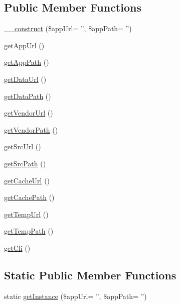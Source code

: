 \subsection*{Public Member Functions}
\begin{DoxyCompactItemize}
\item 
\hyperlink{classTk_1_1Config_ae330d7a7e50597ab4b06e9713b2e629c}{\+\_\+\+\_\+construct} (\$app\+Url= '', \$app\+Path= '')
\item 
\hyperlink{classTk_1_1Config_aaf64cfba50af0da87adcee508253d652}{get\+App\+Url} ()
\item 
\hyperlink{classTk_1_1Config_a663d12fd13dd70777756cff67001b43d}{get\+App\+Path} ()
\item 
\hyperlink{classTk_1_1Config_ac7fab993eb970174b662639954132b2c}{get\+Data\+Url} ()
\item 
\hyperlink{classTk_1_1Config_a194ce70e71e59431958662ce932e57da}{get\+Data\+Path} ()
\item 
\hyperlink{classTk_1_1Config_aab2a6666aee90ed5bd9805f44894ef69}{get\+Vendor\+Url} ()
\item 
\hyperlink{classTk_1_1Config_ae8ed66cab17c82847c779f1356a26555}{get\+Vendor\+Path} ()
\item 
\hyperlink{classTk_1_1Config_a6dfe526acbc3299db77e9251deb731d5}{get\+Src\+Url} ()
\item 
\hyperlink{classTk_1_1Config_ad214878dbfdeeaca36c876c17c3b7cfe}{get\+Src\+Path} ()
\item 
\hyperlink{classTk_1_1Config_adff63f0d8c8b5ac24395edae3a6ab364}{get\+Cache\+Url} ()
\item 
\hyperlink{classTk_1_1Config_a5cd69177657c4eec63a981bceb3c8208}{get\+Cache\+Path} ()
\item 
\hyperlink{classTk_1_1Config_a89a075190ce0e61460a0e0e087eeaa94}{get\+Temp\+Url} ()
\item 
\hyperlink{classTk_1_1Config_a9c8429bc4389ec667da5a5d36c9eeb40}{get\+Temp\+Path} ()
\item 
\hyperlink{classTk_1_1Config_aa37ded1aff99203676dbcba44a9c5b26}{get\+Cli} ()
\end{DoxyCompactItemize}
\subsection*{Static Public Member Functions}
\begin{DoxyCompactItemize}
\item 
static \hyperlink{classTk_1_1Config_a3bff1684d5e067d86e4874c81ec1a69a}{get\+Instance} (\$app\+Url= '', \$app\+Path= '')
\end{DoxyCompactItemize}
